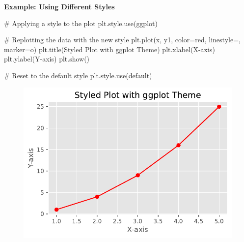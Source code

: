 \documentclass[
  letterpaper,
  DIV=11,
  numbers=noendperiod]{scrreprt}
\newenvironment{Shaded}{\begin{snugshade}}{\end{snugshade}}
\newcommand{\CommentTok}[1]{\textcolor[rgb]{0.37,0.37,0.37}{#1}}
\newcommand{\NormalTok}[1]{\textcolor[rgb]{0.00,0.23,0.31}{#1}}
\newcommand{\OperatorTok}[1]{\textcolor[rgb]{0.37,0.37,0.37}{#1}}
\newcommand{\StringTok}[1]{\textcolor[rgb]{0.13,0.47,0.30}{#1}}
\begin{document}
\textbf{Example: Using Different Styles}

\begin{Shaded}
\begin{Highlighting}[]
\CommentTok{\# Applying a style to the plot}
\NormalTok{plt.style.use(}\StringTok{\textquotesingle{}ggplot\textquotesingle{}}\NormalTok{)}

\CommentTok{\# Replotting the data with the new style}
\NormalTok{plt.plot(x, y1, color}\OperatorTok{=}\StringTok{\textquotesingle{}red\textquotesingle{}}\NormalTok{, linestyle}\OperatorTok{=}\StringTok{\textquotesingle{}{-}\textquotesingle{}}\NormalTok{, marker}\OperatorTok{=}\StringTok{\textquotesingle{}o\textquotesingle{}}\NormalTok{)}
\NormalTok{plt.title(}\StringTok{\textquotesingle{}Styled Plot with ggplot Theme\textquotesingle{}}\NormalTok{)}
\NormalTok{plt.xlabel(}\StringTok{\textquotesingle{}X{-}axis\textquotesingle{}}\NormalTok{)}
\NormalTok{plt.ylabel(}\StringTok{\textquotesingle{}Y{-}axis\textquotesingle{}}\NormalTok{)}
\NormalTok{plt.show()}

\CommentTok{\# Reset to the default style}
\NormalTok{plt.style.use(}\StringTok{\textquotesingle{}default\textquotesingle{}}\NormalTok{)}
\end{Highlighting}
\end{Shaded}

\begin{figure}[H]

{\centering \includegraphics{15_Data_Vis_files/figure-pdf/cell-8-output-1.pdf}

}

\end{figure}
\end{document}
